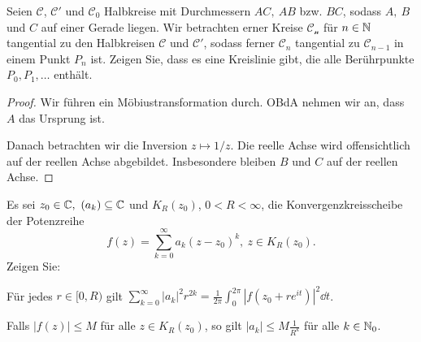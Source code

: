 \begin{Problem}
	Seien $\mathcal{C}$, $\mathcal{C}'$ und $\mathcal{C}_0$ Halbkreise mit Durchmessern $AC,~AB$ bzw. $BC$, sodass $A,~B$ und $C$ auf einer Gerade liegen. Wir betrachten erner Kreise $\mathcal{C_n}$ f\"{u}r $n\in \mathbb{N}$ tangential zu den Halbkreisen $\mathcal{C}$ und $\mathcal{C}'$, sodass ferner $\mathcal{C}_n$ tangential zu $\mathcal{C}_{n-1}$ in einem Punkt $P_n$ ist. Zeigen Sie, dass es eine Kreislinie gibt, die alle Berührpunkte $P_0,P_1,\dots$ enthält.

	{
	\begin{center}
	\end{center}
}
\end{Problem}
\begin{proof}
	Wir führen ein Möbiustransformation durch. OBdA nehmen wir an, dass $A$ das Ursprung ist. 

	Danach betrachten wir die Inversion $z\mapsto 1 / z$. Die reelle Achse wird offensichtlich auf der reellen Achse abgebildet. Insbesondere bleiben $B$ und $C$ auf der reellen Achse.
\end{proof}
\begin{Problem}
	Es sei $z_0\in \mathbb{C},~(a_k)\subseteq \mathbb{C}$ und $K_R(z_0)$, $0<R<\infty$, die Konvergenzkreisscheibe der Potenzreihe
	\[
		f(z)=\sum_{k=0}^\infty a_k(z-z_0)^k,~z\in K_R(z_0)
	.\] 
	Zeigen Sie:
	\begin{parts}
		\item F\"{u}r jedes $r\in [0,R)$ gilt $\sum_{k=0}^\infty |a_k|^2 r^{2k}=\frac{1}{2\pi}\int_0^{2\pi} |f(z_0+re^{it})|^2\dd{t}$.
		\item Falls $|f(z)|\le M$ f\"{u}r alle $z\in K_R(z_0)$, so gilt $|a_k|\le M \frac{1}{R^k}$ f\"{u}r alle $k\in \mathbb{N}_0$.
	\end{parts}
\end{Problem}

